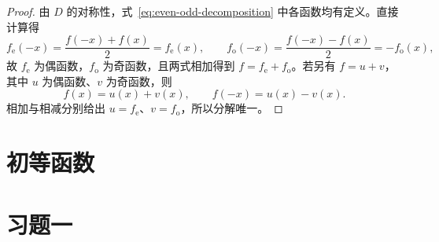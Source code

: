 \begin{proof}
由 $D$ 的对称性，式~\eqref{eq:even-odd-decomposition} 中各函数均有定义。直接计算得
\[
    f_{\mathrm e}(-x)=\frac{f(-x)+f(x)}{2}=f_{\mathrm e}(x),
    \qquad
    f_{\mathrm o}(-x)=\frac{f(-x)-f(x)}{2}=-f_{\mathrm o}(x),
\]
故 $f_{\mathrm e}$ 为偶函数，$f_{\mathrm o}$ 为奇函数，且两式相加得到 $f=f_{\mathrm e}+f_{\mathrm o}$。若另有 $f=u+v$，其中 $u$ 为偶函数、$v$ 为奇函数，则
\[
    f(x)=u(x)+v(x),\qquad f(-x)=u(x)-v(x).
\]
相加与相减分别给出 $u=f_{\mathrm e}$、$v=f_{\mathrm o}$，所以分解唯一。
\end{proof}

\section{初等函数}
\label{sec:elementary-functions}

\section*{习题一}
